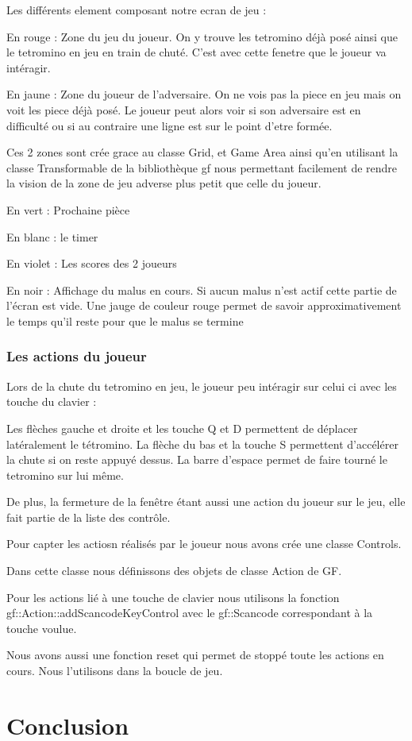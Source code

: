 \documentclass[a4paper, 12pt]{article}
\begin{document}
			Les différents element composant notre ecran de jeu : 

			En rouge : Zone du jeu du joueur. On y trouve les tetromino déjà posé ainsi que le tetromino en jeu en train de chuté. C’est avec cette fenetre que le joueur va intéragir.

			En jaune : Zone du joueur de l’adversaire. On ne vois pas la piece en jeu mais on voit les piece déjà posé. Le joueur peut alors voir si son adversaire est en difficulté ou si au contraire une ligne est sur le point d’etre formée.


			Ces 2 zones sont crée grace au classe Grid, et Game Area ainsi qu’en utilisant la classe Transformable de la bibliothèque gf nous permettant facilement de rendre la vision de la zone de jeu adverse plus petit que celle du joueur.

			En vert : Prochaine pièce

			En blanc : le timer

			En violet : Les scores des 2 joueurs

			En noir : Affichage du malus en cours. Si aucun malus n’est actif cette partie de l’écran est vide. Une jauge de couleur rouge permet de savoir approximativement le temps qu’il reste pour que le malus se termine


		\subsubsection{Les actions du joueur}

			Lors de la chute du tetromino en jeu, le joueur peu intéragir sur celui ci avec les touche du clavier :

			Les flèches gauche et droite et les touche Q et D permettent de déplacer latéralement le tétromino.
			La flèche du bas et la touche S permettent d’accélérer la chute si on reste appuyé dessus.
			La barre d’espace permet de faire tourné le tetromino sur lui même.

			De plus, la fermeture de la fenêtre étant aussi une action du joueur sur le jeu, elle fait partie de la liste des contrôle.


			Pour capter les actiosn réalisés par le joueur nous avons crée une classe Controls.

			Dans cette classe nous définissons des objets de classe Action de GF.

			Pour les actions lié à une touche de clavier nous utilisons la fonction gf::Action::addScancodeKeyControl avec le gf::Scancode correspondant à la touche voulue.

			Nous avons aussi une fonction reset qui permet de stoppé toute les actions en cours. Nous l’utilisons dans la boucle de jeu.
	
	

\section*{Conclusion}
\end{document}
